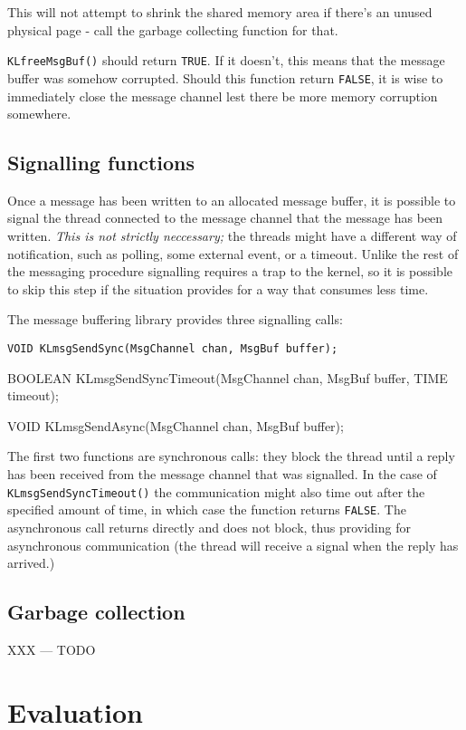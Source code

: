 \documentclass[]{article}
\begin{document}
This will not attempt to shrink the shared memory area if there's an
unused physical page - call the garbage collecting function for that.

{\tt KLfreeMsgBuf()} should return {\tt TRUE}.  If it doesn't, this means
that the message buffer was somehow corrupted.  Should this function
return {\tt FALSE}, it is wise to immediately close the message channel
lest there be more memory corruption somewhere.

\subsection{Signalling functions}

Once a message has been written to an allocated message buffer, it is
possible to signal the thread connected to the message channel that the
message has been written. {\it This is not strictly neccessary;\/} the
threads might have a different way of notification, such as polling, some
external event, or a timeout.  Unlike the rest of the messaging procedure
signalling requires a trap to the kernel, so it is possible to skip this
step if the situation provides for a way that consumes less time.

The message buffering library provides three signalling calls:

{\parindent0.6cm\tt VOID KLmsgSendSync(MsgChannel chan, MsgBuf buffer);

\parskip0.04cm BOOLEAN KLmsgSendSyncTimeout(MsgChannel chan, MsgBuf buffer, TIME timeout);

VOID KLmsgSendAsync(MsgChannel chan, MsgBuf buffer);}

The first two functions are synchronous calls:  they block the thread
until a reply has been received from the message channel that was
signalled.  In the case of {\tt KLmsgSendSyncTimeout()} the communication 
might also time out after the specified amount of time, in which case the
function returns {\tt FALSE}.  The asynchronous call returns directly and
does not block, thus providing for asynchronous communication (the thread
will receive a signal when the reply has arrived.)

\subsection{Garbage collection}

XXX --- TODO

\section{Evaluation}
\end{document}
